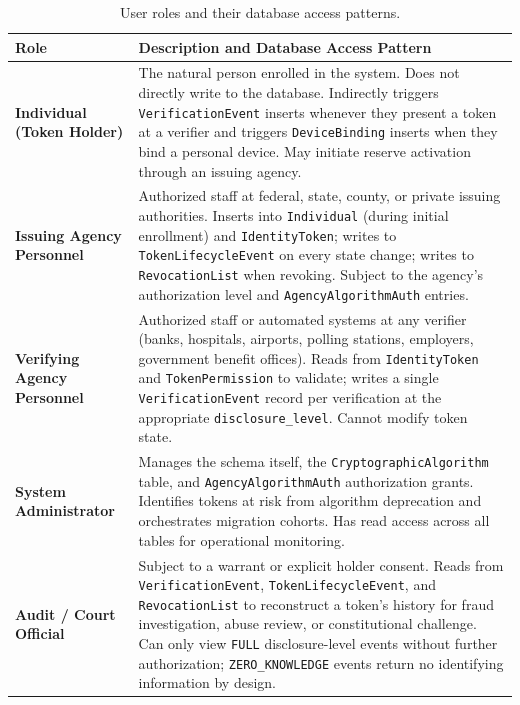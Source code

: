 \documentclass[11pt,letterpaper]{article}
\newcommand{\entity}[1]{\texttt{\color{navydark}#1}}
\newcommand{\thead}[1]{\textbf{\color{white}\small #1}}
\begin{document}
\begin{table}[H]
\centering
\footnotesize
\caption{User roles and their database access patterns.}
\setlength{\tabcolsep}{5pt}
\renewcommand{\arraystretch}{1.1}
\begin{tabularx}{\textwidth}{>{\bfseries\RaggedRight\arraybackslash}p{1.85in} >{\RaggedRight\arraybackslash}X}
\toprule
\rowcolor{tabheader}
\thead{Role} & \thead{Description and Database Access Pattern} \\
\midrule
Individual (Token Holder) & The natural person enrolled in the system. Does not directly write to the database. Indirectly triggers \entity{VerificationEvent} inserts whenever they present a token at a verifier and triggers \entity{DeviceBinding} inserts when they bind a personal device. May initiate reserve activation through an issuing agency. \\
Issuing Agency Personnel & Authorized staff at federal, state, county, or private issuing authorities. Inserts into \entity{Individual} (during initial enrollment) and \entity{IdentityToken}; writes to \entity{TokenLifecycleEvent} on every state change; writes to \entity{RevocationList} when revoking. Subject to the agency's authorization level and \entity{AgencyAlgorithmAuth} entries. \\
Verifying Agency Personnel & Authorized staff or automated systems at any verifier (banks, hospitals, airports, polling stations, employers, government benefit offices). Reads from \entity{IdentityToken} and \entity{TokenPermission} to validate; writes a single \entity{VerificationEvent} record per verification at the appropriate \texttt{disclosure\_level}. Cannot modify token state. \\
System Administrator & Manages the schema itself, the \entity{CryptographicAlgorithm} table, and \entity{AgencyAlgorithmAuth} authorization grants. Identifies tokens at risk from algorithm deprecation and orchestrates migration cohorts. Has read access across all tables for operational monitoring. \\
Audit / Court Official & Subject to a warrant or explicit holder consent. Reads from \entity{VerificationEvent}, \entity{TokenLifecycleEvent}, and \entity{RevocationList} to reconstruct a token's history for fraud investigation, abuse review, or constitutional challenge. Can only view \texttt{FULL} disclosure-level events without further authorization; \texttt{ZERO\_KNOWLEDGE} events return no identifying information by design. \\
\bottomrule
\end{tabularx}
\end{table}
\end{document}
